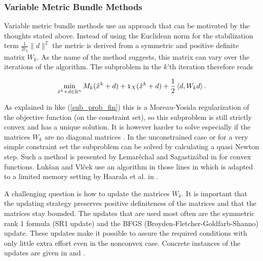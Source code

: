 
\subsubsection{Variable Metric Bundle Methods}

Variable metric bundle methods use an approach that can be motivated by the thoughts stated above.
Instead of using the Euclidean norm for the stabilization term \(\frac{1}{2t_k}\|d\|^2 \) the metric is derived from a symmetric and positive definite matrix \(W_k\). As the name of the method suggests, this matrix can vary over the iterations of the algorithm. The subproblem in the \(k\)'th iteration therefore reads 

\begin{equation*}
	\min_{\hat{x}^k+d \in \mathbb{R}^n} M_k(\hat{x}^k+d)+\mathtt{i}_{X}(\hat{x}^k+d)+\frac{1}{2}\left\langle d,W_kd \right\rangle.
\end{equation*}

As explained in \cite[chapter XV.4]{Lemarechal1994} like (\ref{sub_prob_fin}) this is a Moreau-Yosida regularization of the objective function (on the constraint set), so this subproblem is still strictly convex and has a unique solution. It is however harder to solve especially if the matrices \(W_k\) are no diagonal matrices \cite[p. 594]{Luksan1999}.
In the unconstrained case or for a very simple constraint set the subproblem can be solved by calculating a quasi Newton step. Such a method is presented by Lemar\'{e}chal and Sagastiz\'{a}bal in \cite{Lemarechal1997} for convex functions. Luk\v{s}an and {Vl\v{c}ek} use an algorithm in those lines in \cite{Vlcek2001} which is adapted to a limited memory setting by Haarala et al. in \cite{Haarala2007}.

A challenging question is how to update the matrices \(W_k\). It is important that the updating strategy preserves positive definiteness of the matrices and that the matrices stay bounded. The updates that are used most often are the symmetric rank 1 formula (SR1 update) and the BFGS (Broyden-Fletcher-Goldfarb-Shanno) update. These updates make it possible to assure the required conditions with only little extra effort even in the nonconvex case. Concrete instances of the updates are given in \cite{Vlcek2001} and \cite{Lemarechal1994}.

